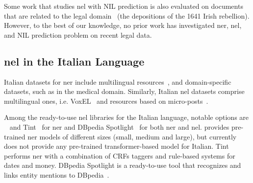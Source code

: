 Some work that studies \ac{nel} with NIL prediction is also evaluated on documents that are related to the legal domain~\cite{klie-etal-2020-zero} (the depositions of the 1641 Irish rebellion). %
However, to the best of our knowledge, no prior work has investigated \ac{ner}, \ac{nel}, and NIL prediction problem on recent legal data. 

\subsection{\ac{nel} in the Italian Language}
Italian datasets for \ac{ner} include multilingual resources~\cite{tedeschi-navigli-2022-multinerd,NOTHMAN2013151}, and domain-specific datasets, such as \cite{CATELLI2020106779} in the medical domain.
Similarly, Italian \ac{nel} datasets comprise multilingual ones, i.e. VoxEL~\cite{rosales2018voxel} and resources based on micro-posts~\cite{basile2016neelit}.

Among the ready-to-use \ac{nel} libraries for the Italian language, notable options are \spacy~\cite{honnibal2020spacy} and Tint~\cite{2018tint2} for \ac{ner} and DBpedia Spotlight~\cite{mendes_2011_spotlight,Daiber2013spotlight} for both \ac{ner} and \ac{nel}.
\Spacy provides pre-trained \ac{ner} models of different sizes (small, medium and large), but currently does not provide any pre-trained transformer-based model for Italian. Tint performs \ac{ner} with a combination of CRFs taggers and rule-based systems for dates and money.
DBpedia Spotlight is a ready-to-use tool that recognizes and links entity mentions to DBpedia~\cite{dbpedia}.
